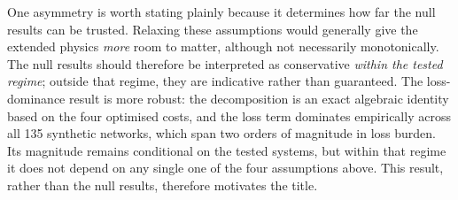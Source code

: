 \documentclass[a4paper,fleqn]{cas-sc}
\begin{document}
One asymmetry is worth stating plainly because it determines how far the null results can be
trusted. Relaxing these assumptions would generally give the extended physics \emph{more} room
to matter, although not necessarily monotonically. The null results should therefore be
interpreted as conservative \emph{within the tested regime}; outside that regime, they are
indicative rather than guaranteed. The loss-dominance result is more robust: the decomposition
is an exact algebraic identity based on the four optimised costs, and the loss term dominates
empirically across all 135 synthetic networks, which span two orders of magnitude in loss
burden. Its magnitude remains conditional on the tested systems, but within that regime it
does not depend on any single one of the four assumptions above. This result, rather than the
null results, therefore motivates the title.
\end{document}
